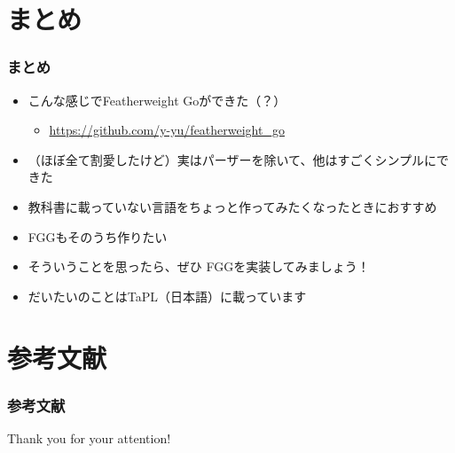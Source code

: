 \section{まとめ}
\begin{frame}
  \frametitle{まとめ}

  \pause
  \begin{itemize}
    \item<+-> こんな感じでFeatherweight Goができた（？）
    \begin{itemize}
      \item \url{https://github.com/y-yu/featherweight_go}
    \end{itemize}

    \item<+-> （ほぼ全て割愛したけど）実はパーザーを除いて、他はすごくシンプルにできた

    \item<+-> 教科書に載っていない言語をちょっと作ってみたくなったときにおすすめ

    \item<+-> FGGもそのうち作りたい


    \item<+-> そういうことを思ったら、ぜひ
    FGGを実装してみましょう！

    \item<+-> だいたいのことはTaPL（日本語）\cite{BB12112636}に載っています
  \end{itemize}
\end{frame}

\section*{参考文献}

\begin{frame}[allowframebreaks]
  \frametitle{参考文献}

  
  
\end{frame}

\begin{frame}
  \centering
  {\Huge Thank you for your attention!}
\end{frame}


